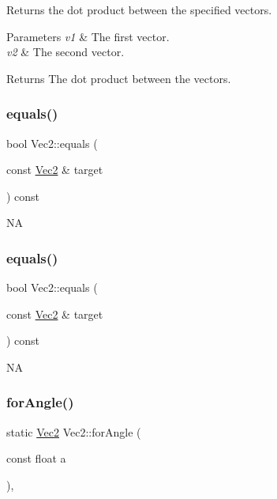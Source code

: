 Returns the dot product between the specified vectors.


\begin{DoxyParams}{Parameters}
{\em v1} & The first vector. \\
\hline
{\em v2} & The second vector.\\
\hline
\end{DoxyParams}
\begin{DoxyReturn}{Returns}
The dot product between the vectors. 
\end{DoxyReturn}
\mbox{\label{classVec2_a56fd3f594c7532a7ba84ea3473257671}} 
\subsubsection{\texorpdfstring{equals()}{equals()}\hspace{0.1cm}{\footnotesize\ttfamily [1/2]}}
{\footnotesize\ttfamily bool Vec2\+::equals (\begin{DoxyParamCaption}\item[{const \hyperlink{classVec2}{Vec2} \&}]{target }\end{DoxyParamCaption}) const}

NA \mbox{\label{classVec2_a56fd3f594c7532a7ba84ea3473257671}} 
\subsubsection{\texorpdfstring{equals()}{equals()}\hspace{0.1cm}{\footnotesize\ttfamily [2/2]}}
{\footnotesize\ttfamily bool Vec2\+::equals (\begin{DoxyParamCaption}\item[{const \hyperlink{classVec2}{Vec2} \&}]{target }\end{DoxyParamCaption}) const}

NA \mbox{\label{classVec2_aba30a4b093635bdd1fa4e329e93455d9}} 
\subsubsection{\texorpdfstring{for\+Angle()}{forAngle()}\hspace{0.1cm}{\footnotesize\ttfamily [1/2]}}
{\footnotesize\ttfamily static \hyperlink{classVec2}{Vec2} Vec2\+::for\+Angle (\begin{DoxyParamCaption}\item[{const float}]{a }\end{DoxyParamCaption})\hspace{0.3cm}{\ttfamily [inline]}, {\ttfamily [static]}}

